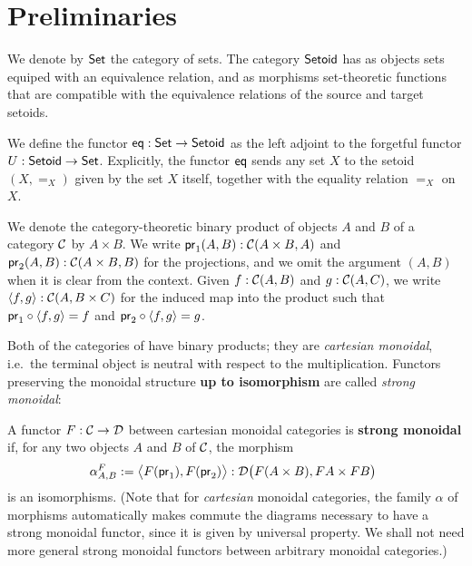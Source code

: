 \documentclass{amsart}
\newcommand{\fat}[1]{\textbf{#1}}
\begin{document}
\section{Preliminaries}\label{sec:preliminaries}


\begin{definition}\label{def:set_setoid}
 We denote by $\Set$ the category of sets. The category $\Setoid$ has as objects sets equiped with an equivalence relation,
 and as morphisms set-theoretic functions that are compatible with the equivalence relations of the source and target setoids.
\end{definition}



\begin{definition}\label{def:eq}
 We define the functor $\eq : \Set\to\Setoid$ as the left adjoint to the forgetful functor 
  $U : \Setoid \to \Set$.
  Explicitly, the functor $\eq$ sends any set $X$ to the setoid $(X,=_X)$ given by the set $X$ itself, together
  with the equality relation $=_X$ on $X$.
\end{definition}


\begin{remark}
  We denote the category-theoretic binary product of objects $A$ and $B$ of a category $\C$ by $A\times B$.
  We write $\pr_1(A,B) : \C(A\times B, A)$ and $\pr_2(A,B) :\C(A\times B, B)$ for the projections, and we omit the 
  argument $(A,B)$ when it is clear from the context.
  Given $f : \C(A, B)$ and $g : \C(A,C)$, we write $\langle f,g\rangle : \C(A,B\times C)$ for the induced map into the product such that
  $\comp{\langle f,g\rangle}{\pr_1} = f$ and $\comp{\langle f,g\rangle}{\pr_2} = g$.
\end{remark}

Both of the categories of  have binary products; they are \emph{cartesian monoidal}, i.e.\ the terminal 
object is neutral with respect to the multiplication. Functors preserving the monoidal structure \textbf{up to isomorphism}
are called \emph{strong monoidal}:

\begin{definition}\label{def:monoidal_functor}
 A functor $F:\C\to\D$ between cartesian monoidal categories is \fat{strong monoidal} if, for any two objects $A$ and $B$ of $\C$,
  the morphism
 \[ \alpha^F_{A,B} := \bigl\langle F(\pr_1), F(\pr_2) \bigr\rangle : \D\bigl(F(A\times B), FA\times FB\bigr)\enspace  \] 
 is an isomorphisms.
 (Note that for \emph{cartesian} monoidal categories, the family $\alpha$ of morphisms automatically makes commute the 
  diagrams necessary to have a strong monoidal functor, since it is given by universal property. 
  We shall not need more general strong monoidal functors between arbitrary monoidal categories.)
\end{definition}
\end{document}
